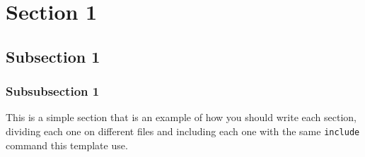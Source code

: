 \section{Section 1}
\subsection{Subsection 1}
\subsubsection{Subsubsection 1}

This is a simple section that is an example of how you should write each
section, dividing each one on different files and including each one with the
same \texttt{include} command this template use.
